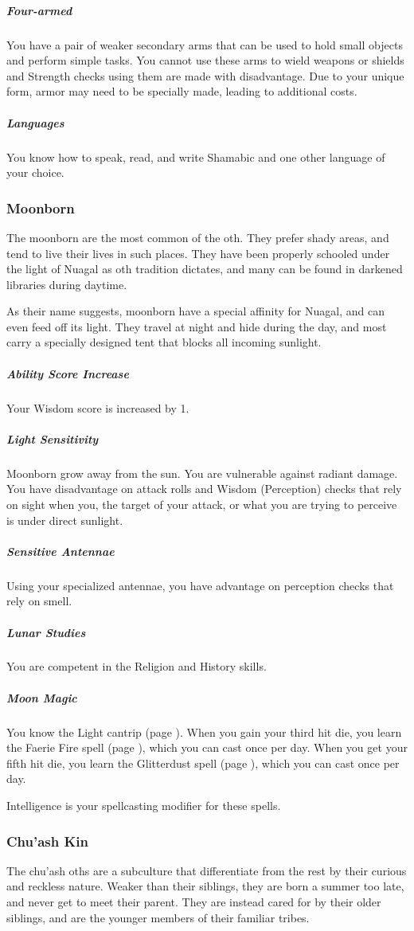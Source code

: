 \subparagraph{Four-armed} You have a pair of weaker secondary arms that can be used to hold small objects and perform simple tasks.
You cannot use these arms to wield weapons or shields and Strength checks using them are made with disadvantage.
Due to your unique form, armor may need to be specially made, leading to additional costs.

\subparagraph{Languages} You know how to speak, read, and write Shamabic and one other language of your choice.

\subsubsection{Moonborn}
The moonborn are the most common of the oth.
They prefer shady areas, and tend to live their lives in such places.
They have been properly schooled under the light of Nuagal as oth tradition dictates, and many can be found in darkened libraries during daytime.

As their name suggests, moonborn have a special affinity for Nuagal, and can even feed off its light.
They travel at night and hide during the day, and most carry a specially designed tent that blocks all incoming sunlight.

\subparagraph{Ability Score Increase} Your Wisdom score is increased by 1.

\subparagraph{Light Sensitivity} Moonborn grow away from the sun.
You are vulnerable against radiant damage.
You have disadvantage on attack rolls and Wisdom (Perception) checks that rely on sight when you, the target of your attack, or what you are trying to perceive is under direct sunlight.

\subparagraph{Sensitive Antennae} Using your specialized antennae, you have advantage on perception checks that rely on smell.

\subparagraph{Lunar Studies} You are competent in the Religion and History skills.

\subparagraph{Moon Magic} You know the Light cantrip (page \pageref{spell::light}).
When you gain your third hit die, you learn the Faerie Fire spell (page \pageref{spell::faeriefire}), which you can cast once per day.
When you get your fifth hit die, you learn the Glitterdust spell (page \pageref{spell::glitterdust}), which you can cast once per day.

Intelligence is your spellcasting modifier for these spells.

\subsubsection{Chu'ash Kin}
The chu'ash oths are a subculture that differentiate from the rest by their curious and reckless nature.
Weaker than their siblings, they are born a summer too late, and never get to meet their parent.
They are instead cared for by their older siblings, and are the younger members of their familiar tribes.


